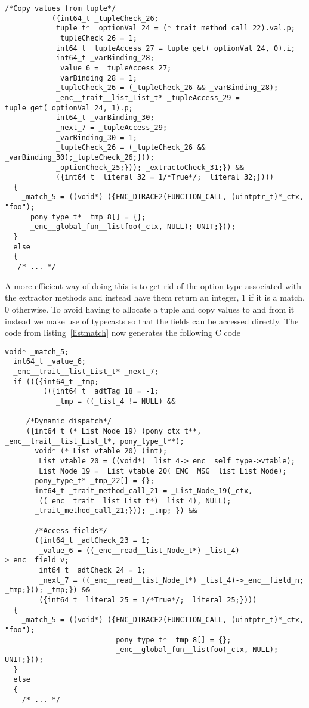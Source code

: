 \documentclass[10pt]{report}
\begin{document}
{\begin{lstlisting}[language=encore,caption={Pattern matching on a List},label=matchgen]
          /*Copy values from tuple*/ 
           ({int64_t _tupleCheck_26;
            tuple_t* _optionVal_24 = (*_trait_method_call_22).val.p;
            _tupleCheck_26 = 1;
            int64_t _tupleAccess_27 = tuple_get(_optionVal_24, 0).i;
            int64_t _varBinding_28;
            _value_6 = _tupleAccess_27;
            _varBinding_28 = 1;
            _tupleCheck_26 = (_tupleCheck_26 && _varBinding_28);
            _enc__trait__list_List_t* _tupleAccess_29 = tuple_get(_optionVal_24, 1).p;
            int64_t _varBinding_30;
            _next_7 = _tupleAccess_29;
            _varBinding_30 = 1;
            _tupleCheck_26 = (_tupleCheck_26 && _varBinding_30);_tupleCheck_26;}));
            _optionCheck_25;})); _extractoCheck_31;}) &&
            ({int64_t _literal_32 = 1/*True*/; _literal_32;})))
  {
    _match_5 = ((void*) ({ENC_DTRACE2(FUNCTION_CALL, (uintptr_t)*_ctx, "foo");
      pony_type_t* _tmp_8[] = {};
      _enc__global_fun__listfoo(_ctx, NULL); UNIT;}));
  }
  else
  {
   /* ... */
\end{lstlisting}

\par{A more efficient way of doing this is to get rid of the option type associated with the extractor methods and instead have them return an integer, 1 if it is a match, 0 otherwise. To avoid having to allocate a tuple and copy values to and from it instead we make use of typecasts so that the fields can be accessed directly. The code from listing~\ref{listmatch} now generates the following C code}

\begin{lstlisting}[language=encore,caption={Pattern matching on a List},label=matchgen2]
 void* _match_5;
  int64_t _value_6;
  _enc__trait__list_List_t* _next_7;
  if ((({int64_t _tmp;
         (({int64_t _adtTag_18 = -1;
            _tmp = ((_list_4 != NULL) &&
     
     /*Dynamic dispatch*/ 
     ({int64_t (*_List_Node_19) (pony_ctx_t**, _enc__trait__list_List_t*, pony_type_t**);
       void* (*_List_vtable_20) (int);
       _List_vtable_20 = ((void*) _list_4->_enc__self_type->vtable);
       _List_Node_19 = _List_vtable_20(_ENC__MSG__list_List_Node);
       pony_type_t* _tmp_22[] = {};
       int64_t _trait_method_call_21 = _List_Node_19(_ctx,
        ((_enc__trait__list_List_t*) _list_4), NULL);
       _trait_method_call_21;})); _tmp; }) &&
       
       /*Access fields*/
       ({int64_t _adtCheck_23 = 1;
        _value_6 = ((_enc__read__list_Node_t*) _list_4)->_enc__field_v;
        int64_t _adtCheck_24 = 1;
        _next_7 = ((_enc__read__list_Node_t*) _list_4)->_enc__field_n; _tmp;})); _tmp;}) &&
        ({int64_t _literal_25 = 1/*True*/; _literal_25;})))
  {
    _match_5 = ((void*) ({ENC_DTRACE2(FUNCTION_CALL, (uintptr_t)*_ctx, "foo");
                          pony_type_t* _tmp_8[] = {};
                          _enc__global_fun__listfoo(_ctx, NULL); UNIT;}));
  }
  else
  {
    /* ... */


\end{lstlisting}}
\end{document}
